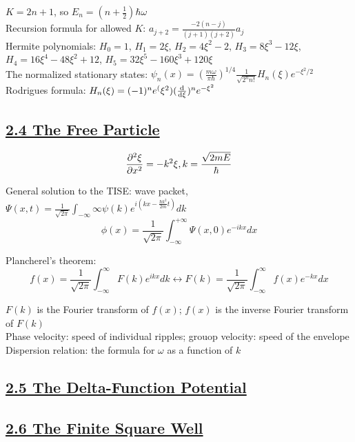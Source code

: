 $K = 2n + 1$, so $E_n = (n + \frac{1}{2}) \hbar \omega$ \\

Recursion formula for allowed $K$: $a_{j+2} = \frac{-2(n - j)}{(j+1)(j+2)} a_j$ \\

Hermite polynomials: $H_0 = 1$, $H_1 = 2 \xi$, $H_2 = 4 \xi^2 - 2$, $H_3 = 8 \xi^3 - 12 \xi$, $H_4 = 16 \xi^4 - 48 \xi^2 + 12$, $H_5 = 32 \xi^5 - 160 \xi^3 + 120 \xi$ \\

The normalized stationary states: $\psi_n(x) = (\frac{m \omega}{\pi \hbar})^{1/4} \frac{1}{\sqrt{2^n n!}} H_n(\xi) e^{-\xi^2 / 2}$ \\

Rodrigues formula: $H_n(\xi) = (-1)^n e^(\xi^2) (\dv{}{\xi})^n e^{-\xi^2}$

\subsection{\underline{2.4 The Free Particle}}
$$\pdv[2]{\xi}{x} = -k^2 \xi, k = \frac{\sqrt{2mE}}{\hbar}$$

General solution to the TISE: wave packet, $\Psi(x, t) = \frac{1}{\sqrt{2\pi}} \int_{-\infty}{\infty} \psi(k) e^{i (kx - \frac{\hbar k^2}{2m} t)} dk$ \\
$$\phi(x) = \frac{1}{\sqrt{2 \pi}} \int_{-\infty}^{+\infty} \Psi(x, 0) e^{-ikx} dx$$

Plancherel's theorem: $$f(x) = \frac{1}{\sqrt{2 \pi}} \int_{-\infty}^{\infty} F(k) e^{ikx} dk \leftrightarrow F(k) = \frac{1}{\sqrt{2\pi}} \int_{-\infty}^{\infty} f(x) e^{-kx} dx$$

$F(k)$ is the Fourier transform of $f(x)$; $f(x)$ is the inverse Fourier transform of $F(k)$ \\

Phase velocity: speed of individual ripples; grouop velocity: speed of the envelope \\

Dispersion relation: the formula for $\omega$ as a function of $k$

\subsection{\underline{2.5 The Delta-Function Potential}}

\subsection{\underline{2.6 The Finite Square Well}}


